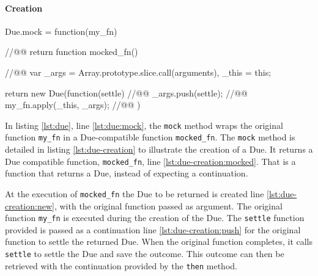 \vspace{\baselineskip}

\paragraph{Creation} \label{chapter5:due:definition:creation}

\begin{code}[js, %
             caption={Creation of a due}, %
             label={lst:due-creation}] %
Due.mock = function(my_fn) { //@\label{lst:due-creation:mock}@
  return function mocked_fn() { //@\label{lst:due-creation:mocked}@
    var _args = Array.prototype.slice.call(arguments),
        _this = this;

    return new Due(function(settle) {  //@\label{lst:due-creation:new}@
      _args.push(settle);  //@\label{lst:due-creation:push}@
      my_fn.apply(_this, _args); //@\label{lst:due-creation:call}@
    })
  }
}
\end{code}


In listing \ref{lst:due}, line \ref{lst:due:mock}, the \texttt{mock} method wraps the original function \texttt{my\_fn} in a Due-compatible function \texttt{mocked\_fn}.
The \texttt{mock} method is detailed in listing \ref{lst:due-creation} to illustrate the creation of a Due.
It returns a Due compatible function, \texttt{mocked\_fn}, line \ref{lst:due-creation:mocked}.
That is a function that returns a Due, instead of expecting a continuation.

At the execution of \texttt{mocked\_fn} the Due to be returned is created line \ref{lst:due-creation:new}, with the original function passed as argument.
The original function \texttt{my\_fn} is executed during the creation of the Due.
The \texttt{settle} function provided is passed as a continuation line \ref{lst:due-creation:push} for the original function to settle the returned Due. %
When the original function completes, it calls \texttt{settle} to settle the Due and save the outcome.
This outcome can then be retrieved with the continuation provided by the \texttt{then} method.

